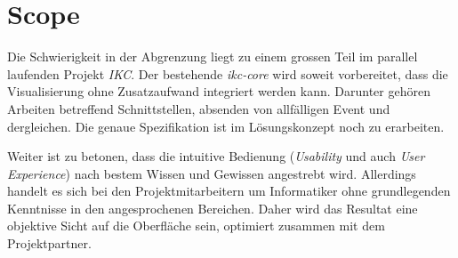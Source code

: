 \section{Scope}
\label{sec:scope}

Die Schwierigkeit in der Abgrenzung liegt zu einem grossen Teil im parallel laufenden Projekt \textit{IKC}. Der bestehende \textit{ikc-core} wird soweit vorbereitet, dass die Visualisierung ohne Zusatzaufwand integriert werden kann. Darunter gehören Arbeiten betreffend Schnittstellen, absenden von allfälligen Event und dergleichen. Die genaue Spezifikation ist im Lösungskonzept noch zu erarbeiten.

Weiter ist zu betonen, dass die intuitive Bedienung (\textit{Usability} und auch \textit{User Experience}) nach bestem Wissen und Gewissen angestrebt wird. Allerdings handelt es sich bei den Projektmitarbeitern um Informatiker ohne grundlegenden Kenntnisse in den angesprochenen Bereichen. Daher wird das Resultat eine objektive Sicht auf die Oberfläche sein, optimiert zusammen mit dem Projektpartner.

